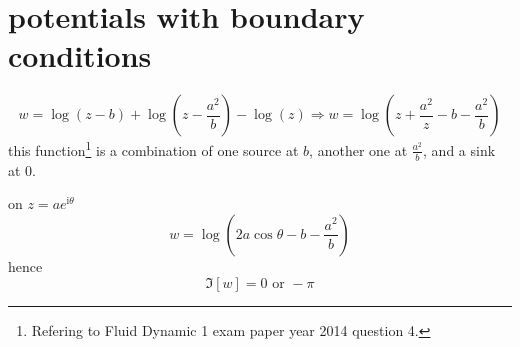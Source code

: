 
\section{potentials with boundary conditions}
\[w=\log (z -b) + \log (z-\frac{a^2}{b})-\log(z)\Longrightarrow w =\log (z +\frac{a^2}{z}-b-\frac{a^2}{b})\]
this function\footnote{Refering to Fluid Dynamic 1 exam paper year 2014 question 4.} is a combination of one source at $b$, another one at $\frac{a^2}{b}$, and a sink at $0$.

on $z=a e^{\mathrm{i}  \theta}$
\[ w=\log (2 a \cos{\theta}-b-\frac{a^2}{b})\]
hence
\[\Im[w]= 0 \text{ or } -\pi\]

\pagebreak
%
%